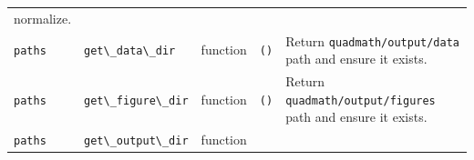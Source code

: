 \documentclass[
  10pt,
]{article}
\newcommand{\passthrough}[1]{#1}
\begin{document}
\begin{longtable}[]{@{}lllll@{}}
\begin{minipage}[t]{0.17\columnwidth}
normalize.\strut
\end{minipage}\tabularnewline
\begin{minipage}[t]{0.17\columnwidth}\raggedright
\passthrough{\lstinline!paths!}\strut
\end{minipage} & \begin{minipage}[t]{0.17\columnwidth}\raggedright
\passthrough{\lstinline!get\_data\_dir!}\strut
\end{minipage} & \begin{minipage}[t]{0.17\columnwidth}\raggedright
function\strut
\end{minipage} & \begin{minipage}[t]{0.17\columnwidth}\raggedright
\passthrough{\lstinline!()!}\strut
\end{minipage} & \begin{minipage}[t]{0.17\columnwidth}\raggedright
Return \passthrough{\lstinline!quadmath/output/data!} path and ensure it
exists.\strut
\end{minipage}\tabularnewline
\begin{minipage}[t]{0.17\columnwidth}\raggedright
\passthrough{\lstinline!paths!}\strut
\end{minipage} & \begin{minipage}[t]{0.17\columnwidth}\raggedright
\passthrough{\lstinline!get\_figure\_dir!}\strut
\end{minipage} & \begin{minipage}[t]{0.17\columnwidth}\raggedright
function\strut
\end{minipage} & \begin{minipage}[t]{0.17\columnwidth}\raggedright
\passthrough{\lstinline!()!}\strut
\end{minipage} & \begin{minipage}[t]{0.17\columnwidth}\raggedright
Return \passthrough{\lstinline!quadmath/output/figures!} path and ensure
it exists.\strut
\end{minipage}\tabularnewline
\begin{minipage}[t]{0.17\columnwidth}\raggedright
\passthrough{\lstinline!paths!}\strut
\end{minipage} & \begin{minipage}[t]{0.17\columnwidth}\raggedright
\passthrough{\lstinline!get\_output\_dir!}\strut
\end{minipage} & \begin{minipage}[t]{0.17\columnwidth}\raggedright
function\strut
\end{minipage} & \begin{minipage}[t]{0.17\columnwidth}\raggedright

\end{minipage}
\end{longtable}
\end{document}
